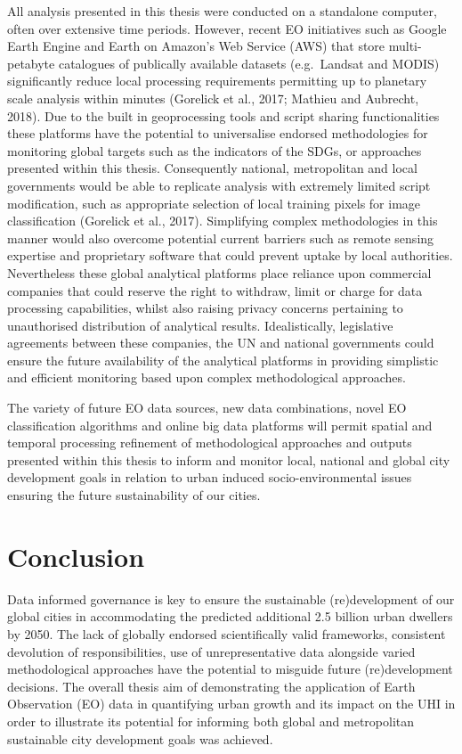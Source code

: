 \documentclass[]{book}
\begin{document}
All analysis presented in this thesis were conducted on a standalone
computer, often over extensive time periods. However, recent EO
initiatives such as Google Earth Engine and Earth on Amazon's Web
Service (AWS) that store multi-petabyte catalogues of publically
available datasets (e.g.~Landsat and MODIS) significantly reduce local
processing requirements permitting up to planetary scale analysis within
minutes (Gorelick et al., 2017; Mathieu and Aubrecht, 2018). Due to the
built in geoprocessing tools and script sharing functionalities these
platforms have the potential to universalise endorsed methodologies for
monitoring global targets such as the indicators of the SDGs, or
approaches presented within this thesis. Consequently national,
metropolitan and local governments would be able to replicate analysis
with extremely limited script modification, such as appropriate
selection of local training pixels for image classification (Gorelick et
al., 2017). Simplifying complex methodologies in this manner would also
overcome potential current barriers such as remote sensing expertise and
proprietary software that could prevent uptake by local authorities.
Nevertheless these global analytical platforms place reliance upon
commercial companies that could reserve the right to withdraw, limit or
charge for data processing capabilities, whilst also raising privacy
concerns pertaining to unauthorised distribution of analytical results.
Idealistically, legislative agreements between these companies, the UN
and national governments could ensure the future availability of the
analytical platforms in providing simplistic and efficient monitoring
based upon complex methodological approaches.

The variety of future EO data sources, new data combinations, novel EO
classification algorithms and online big data platforms will permit
spatial and temporal processing refinement of methodological approaches
and outputs presented within this thesis to inform and monitor local,
national and global city development goals in relation to urban induced
socio-environmental issues ensuring the future sustainability of our
cities.

\chapter{Conclusion}\label{conclusion-2}

Data informed governance is key to ensure the sustainable
(re)development of our global cities in accommodating the predicted
additional 2.5 billion urban dwellers by 2050. The lack of globally
endorsed scientifically valid frameworks, consistent devolution of
responsibilities, use of unrepresentative data alongside varied
methodological approaches have the potential to misguide future
(re)development decisions. The overall thesis aim of demonstrating the
application of Earth Observation (EO) data in quantifying urban growth
and its impact on the UHI in order to illustrate its potential for
informing both global and metropolitan sustainable city development
goals was achieved.
\end{document}
